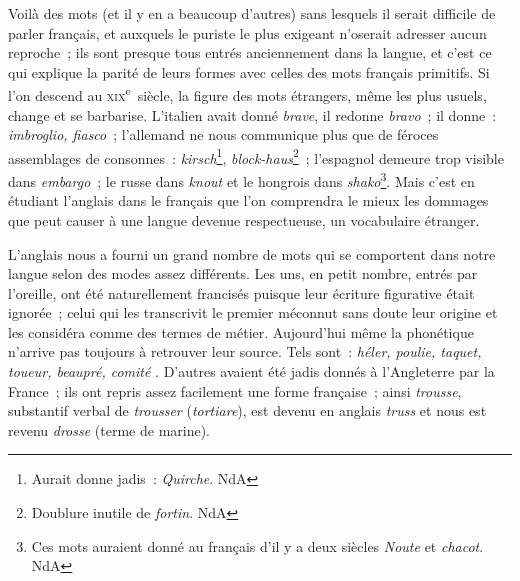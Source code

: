 \documentclass[french,twoside]{book} %
\begin{document}
Voilà des mots (et il y en a beaucoup d’autres) sans lesquels il serait difficile de parler français, et auxquels le puriste le plus exigeant n’oserait adresser aucun reproche ; ils sont presque tous entrés anciennement dans la langue, et c’est ce qui explique la parité de leurs formes avec celles des mots français primitifs. Si l’on descend au \textsc{xix}\textsuperscript{e} siècle, la figure des mots étrangers, même les plus usuels, change et se barbarise. L’italien avait donné {\itshape brave}, il redonne {\itshape bravo} ; il donne : {\itshape imbroglio, fiasco} ; l’allemand ne nous communique plus que de féroces assemblages de consonnes : {\itshape kirsch}\footnote{Aurait donne jadis : {\itshape Quirche}. NdA}, {\itshape block-haus}\footnote{Doublure inutile de {\itshape fortin}. NdA} ; l’espagnol demeure trop visible dans {\itshape embargo} ; le russe dans {\itshape knout} et le hongrois dans {\itshape shako}\footnote{Ces mots auraient donné au français d’il y a deux siècles {\itshape Noute} et {\itshape chacot}. NdA}. Mais c’est en étudiant l’anglais dans le français que l’on comprendra le mieux les dommages que peut causer à une langue devenue respectueuse, un vocabulaire étranger.\par
L’anglais nous a fourni un grand nombre de mots qui se comportent dans notre langue selon des modes assez différents. Les uns, en petit nombre, entrés par l’oreille, ont été naturellement francisés puisque leur écriture figurative était ignorée ; celui qui les transcrivit le premier méconnut sans doute leur origine et les considéra comme des termes de métier. Aujourd’hui même la phonétique n’arrive pas toujours à retrouver leur source. Tels sont : {\itshape héler, poulie, taquet, toueur, beaupré, comité} . D’autres avaient été jadis donnés à l’Angleterre par la France ; ils ont repris assez facilement une forme française ; ainsi {\itshape trousse}, substantif verbal de {\itshape trousser} ({\itshape tortiare}), est devenu en anglais {\itshape truss} et nous est revenu {\itshape drosse} (terme de marine).\par
\end{document}
